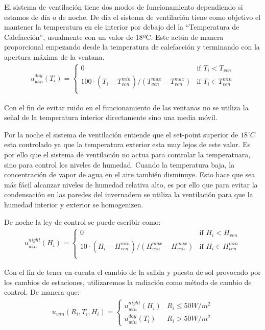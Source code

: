 \documentclass{article}
\begin{document}
El sistema de ventilación tiene dos modos de funcionamiento dependiendo si estamos de día o de noche. De día el sistema de ventilación tiene como objetivo el mantener la temperatura en ele interior por debajo del la “Temperatura de Calefacción”, usualmente con un valor de 18ºC. Este actúa de manera proporcional empezando desde la temperatura de calefacción y terminando con la apertura máxima de la ventana. 
%
\begin{gather}
    u_{win}^{day}(T_i) = \begin{cases}
        0  & \text{if } T_i < T_{ven} \\ 
        100 \cdot (T_i - T_{ven}^{min})/(T_{ven}^{max} - T_{ven}^{max}) & \text{if } T_i \in  T_{ven}^{min} \\
    \end{cases}
\end{gather} 

Con el fin de evitar ruido en el funcionamiento de las ventanas no se utiliza la señal de la temperatura interior directamente sino una media móvil. 
\newline

Por la noche el sistema de ventilación entiende que el set-point superior de $18^\circ C$ esta controlado ya que la temperatura exterior esta muy lejos de este valor. Es por ello que el sistema de ventilación no actua para controlar la temperatuara, sino para control los niveles de humedad. Cuando la temperatura baja, la concentración de vapor de agua en el aire también disminuye. Esto hace que sea más fácil alcanzar niveles de humedad relativa alto, es por ello que para evitar la condensación en las paredes del invernadero se utiliza la ventilación para que la humedad interior y exterior se homogenizen.
\newline

De noche la ley de control se puede escribir como:
\begin{gather}
    u_{win}^{night}(H_i) = \begin{cases}
        0  & \text{if } H_i < H_{ven} \\ 
        10 \cdot (H_i - H_{ven}^{min})/(H_{ven}^{max} - H_{ven}^{max}) & \text{if } H_i \in  H_{ven}^{min} \\
        \end{cases}
\end{gather}

Con el fin de tener en cuenta el cambio de la salida y puesta de sol provocado por los cambios de estaciones, utilizaremos la radiación como método de cambio de control. De manera que: 
\begin{gather}
    u_{win}(R_i,T_i,H_i) = 
    \begin{cases}
        u_{win}^{night}(H_i) & R_i \leq 50 W/m^2 \\[5pt]
        u_{win}^{day}(T_i)   & R_i > 50 W/m^2
    \end{cases}
\end{gather}
\end{document}
